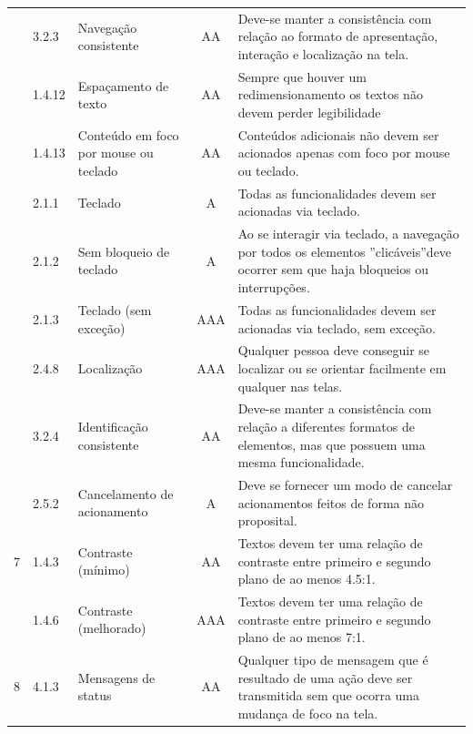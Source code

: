 {{\begin{minipage}{\linewidth}
{\begin{tabular}{|c|l|l|c|p{400px}|}
        \cline{2-5} & 3.2.3 & Navegação consistente & AA & Deve-se manter a consistência com relação ao formato de apresentação, interação e localização na tela. \\
        \cline{2-5} & 1.4.12 & Espaçamento de texto & AA & Sempre que houver um redimensionamento os textos não devem perder legibilidade\\
        \cline{2-5} & 1.4.13 & Conteúdo em foco por mouse ou teclado & AA & Conteúdos adicionais não devem ser acionados apenas com foco por mouse ou teclado.\\
        \cline{2-5} & 2.1.1 & Teclado & A & Todas as funcionalidades devem ser acionadas via teclado. \\
        \cline{2-5} & 2.1.2 & Sem bloqueio de teclado & A & Ao se interagir via teclado, a navegação por todos os elementos ”clicáveis”deve ocorrer sem que haja bloqueios ou interrupções.\\
        \cline{2-5} & 2.1.3 & Teclado (sem exceção) & AAA & Todas as funcionalidades devem ser acionadas via teclado, sem exceção.\\
        \cline{2-5} & 2.4.8 & Localização & AAA & Qualquer pessoa deve conseguir se localizar ou se orientar facilmente em qualquer nas telas.\\
        \cline{2-5} & 3.2.4 & Identificação consistente & AA & Deve-se manter a consistência com relação a diferentes formatos de elementos, mas que possuem uma mesma funcionalidade.\\
        \cline{2-5} & 2.5.2 & Cancelamento de acionamento & A & Deve se fornecer um modo de cancelar acionamentos feitos de forma não proposital.\\
    \hline
    7 & 1.4.3 & 
        Contraste (mínimo) & AA & Textos devem ter uma relação de contraste entre primeiro e segundo plano de ao menos 4.5:1.\\
        \cline{2-5} & 1.4.6 & Contraste (melhorado) & AAA & Textos devem ter uma relação de contraste entre primeiro e segundo plano de ao menos 7:1.\\
    \hline
    8 & 4.1.3 & 
        Mensagens de status & AA & Qualquer tipo de mensagem que é resultado de uma ação deve ser transmitida sem que ocorra uma mudança de foco na tela.\\
    \hline

\end{tabular}}
\label{elementos de UI}

\end{minipage}

}}


